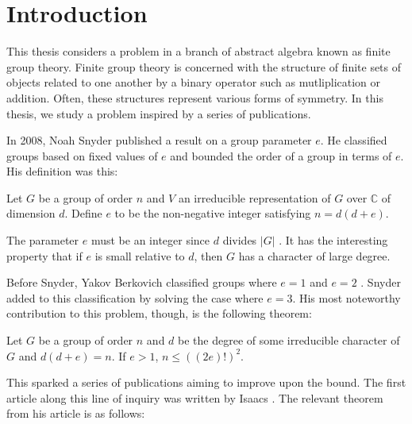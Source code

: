 \documentclass[main.tex]{subfiles}
\begin{document}
\chapter{Introduction}

This thesis considers a problem in a branch of abstract algebra known as finite group theory. Finite group theory is concerned with the structure of finite sets of objects related to one another by a binary operator such as mutliplication or addition. Often, these structures represent various forms of symmetry. In this thesis, we study a problem inspired by a series of publications.

\hss 

In 2008, Noah Snyder \cite{snyderarticle} published a result on a group parameter $e$. He classified groups based on fixed values of $e$ and bounded the order of a group in terms of $e$. His definition was this:

\hss

\begin{definition}
Let $G$ be a group of order $n$ and $V$ an irreducible representation of $G$ over $\mathbb{C}$ of dimension $d$. Define $e$ to be the non-negative integer satisfying $n = d(d + e)$.
\end{definition}

\hss

The parameter $e$ must be an integer since $d$ divides $|G|$ \cite[p.96]{gorensteinfinitegroups}. It has the interesting property that if $e$ is small relative to $d$, then $G$ has a character of large degree.

Before Snyder, Yakov Berkovich classified groups where $e=1$ and $e=2$ \cite{berkovicharticle}. Snyder added to this classification by solving the case where $e=3$. His most noteworthy contribution to this problem, though, is the following theorem:

\hss

\begin{theorem}
Let $G$ be a group of order $n$ and $d$ be the degree of some irreducible character of $G$ and $d(d+e) = n$. If $e > 1$, $n \le ((2e)!)^2$.
\end{theorem}

\hss

This sparked a series of publications aiming to improve upon the bound. The first article along this line of inquiry was written by Isaacs \cite{isaacsarticle}. The relevant theorem from his article is as follows:

\hss
\end{document}

